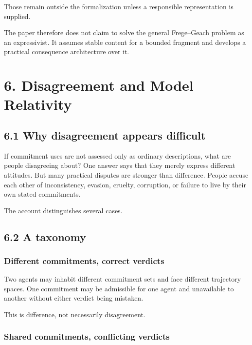 \documentclass[
  11pt,
]{article}
\begin{document}
Those remain outside the formalization unless a responsible
representation is supplied.

The paper therefore does not claim to solve the general Frege--Geach
problem as an expressivist. It assumes stable content for a bounded
fragment and develops a practical consequence architecture over it.

\section{6. Disagreement and Model
Relativity}\label{disagreement-and-model-relativity}

\subsection{6.1 Why disagreement appears
difficult}\label{why-disagreement-appears-difficult}

If commitment uses are not assessed only as ordinary descriptions, what
are people disagreeing about? One answer says that they merely express
different attitudes. But many practical disputes are stronger than
difference. People accuse each other of inconsistency, evasion, cruelty,
corruption, or failure to live by their own stated commitments.

The account distinguishes several cases.

\subsection{6.2 A taxonomy}\label{a-taxonomy}

\subsubsection{Different commitments, correct
verdicts}\label{different-commitments-correct-verdicts}

Two agents may inhabit different commitment sets and face different
trajectory spaces. One commitment may be admissible for one agent and
unavailable to another without either verdict being mistaken.

This is difference, not necessarily disagreement.

\subsubsection{Shared commitments, conflicting
verdicts}\label{shared-commitments-conflicting-verdicts}
\end{document}
